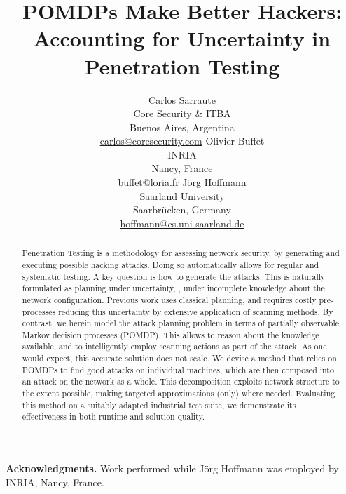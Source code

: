 \documentclass{article}
\title{POMDPs Make Better Hackers:\\ Accounting for Uncertainty in
  Penetration Testing}
\author{
  Carlos Sarraute\\
  Core Security \& ITBA\\
  Buenos Aires, Argentina\\
  \url{carlos@coresecurity.com}
  \And
  Olivier Buffet\\
  INRIA\\
  Nancy, France\\
  \url{buffet@loria.fr}
  \And
  J\"org Hoffmann\\
  Saarland University\\
  Saarbr\"ucken, Germany\\
  \url{hoffmann@cs.uni-saarland.de}
}
\newcommand{\pseudocode}[1]{}
\begin{document}
\maketitle

\begin{abstract}
Penetration Testing is a methodology for assessing network security,
by generating and executing possible hacking attacks. Doing so
automatically allows for regular and systematic testing. A key
question is how to generate the attacks. This is naturally formulated
as planning under uncertainty, \ie, under incomplete knowledge about
the network configuration. Previous work uses classical planning, and
requires costly pre-processes reducing this uncertainty by extensive
application of scanning methods. By contrast, we herein model the
attack planning problem in terms of partially observable Markov
decision processes (POMDP). This allows to reason about the knowledge
available, and to intelligently employ scanning actions as part of the
attack. As one would expect, this accurate solution does not scale. We
devise a method that relies on POMDPs to find good attacks on
individual machines, which are then composed into an attack on the
network as a whole. This decomposition exploits network structure to
the extent possible, making targeted approximations (only) where
needed. Evaluating this method on a suitably adapted industrial test
suite, we demonstrate its effectiveness in both runtime and solution
quality.
\end{abstract}














\medskip
\noindent
\textbf{Acknowledgments.} Work performed while J\"org Hoffmann was
employed by INRIA, Nancy, France.







\pseudocode{

\newpage

\begin{appendix}

\end{appendix}
}
\end{document}
